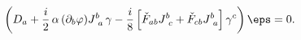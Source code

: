 \begin{equation}
\left( D_a + \frac{i}{2}\, \alpha\, (\partial_b \varphi)J_{~a}^{b} \,\gamma
 -\frac{i}{8} \left[\check{F}_{ab}J^b_{~c}+\check{F}_{cb}J^b_{~a}
 \right] \gamma ^c \right) \eps =0 . \label{6dgrav.b}
\end{equation} 
